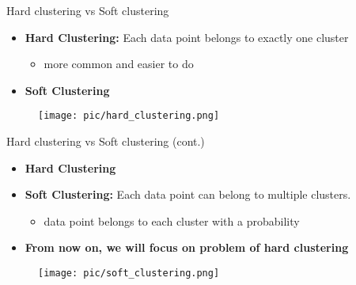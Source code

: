 \documentclass[serif, aspectratio=169]{beamer}
\begin{document}
\begin{frame}{Hard clustering vs Soft clustering}
    \begin{minipage}{0.55\textwidth}
        \begin{itemize}
        \item \textbf{Hard Clustering:} Each data point belongs to exactly one cluster
        \begin{itemize}
            \item more common and easier to do
        \end{itemize}
        \item \textbf{Soft Clustering}
    \end{itemize}
    \end{minipage}%
    \begin{minipage}{0.40\textwidth}
        \begin{figure}
            \centering
            \texttt{[image: pic/hard\_clustering.png]}
        \end{figure}
    \end{minipage}
\end{frame}

\begin{frame}{Hard clustering vs Soft clustering (cont.)}
    \begin{minipage}{0.55\textwidth}
        \begin{itemize}
        \item \textbf{Hard Clustering}
        \item \textbf{Soft Clustering:} Each data point can belong to multiple clusters.
        \begin{itemize}
            \item data point belongs to each cluster with a probability
        \end{itemize}
        \item \textbf{From now on, we will focus on problem of hard clustering}
    \end{itemize}
    \end{minipage}%
    \begin{minipage}{0.40\textwidth}
        \begin{figure}
            \centering
            \texttt{[image: pic/soft\_clustering.png]}
        \end{figure}
    \end{minipage}
\end{frame}
\end{document}

